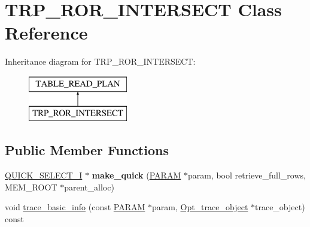 \hypertarget{classTRP__ROR__INTERSECT}{}\section{T\+R\+P\+\_\+\+R\+O\+R\+\_\+\+I\+N\+T\+E\+R\+S\+E\+CT Class Reference}
\label{classTRP__ROR__INTERSECT}
Inheritance diagram for T\+R\+P\+\_\+\+R\+O\+R\+\_\+\+I\+N\+T\+E\+R\+S\+E\+CT\+:\begin{figure}[H]
\begin{center}
\leavevmode
\includegraphics[height=2.000000cm]{classTRP__ROR__INTERSECT}
\end{center}
\end{figure}
\subsection*{Public Member Functions}
\begin{DoxyCompactItemize}
\item 
\mbox{\label{classTRP__ROR__INTERSECT_aec9e0cb402d87f02fa7acf7a63aa6db2}} 
\mbox{\hyperlink{classQUICK__SELECT__I}{Q\+U\+I\+C\+K\+\_\+\+S\+E\+L\+E\+C\+T\+\_\+I}} $\ast$ {\bfseries make\+\_\+quick} (\mbox{\hyperlink{classPARAM}{P\+A\+R\+AM}} $\ast$param, bool retrieve\+\_\+full\+\_\+rows, M\+E\+M\+\_\+\+R\+O\+OT $\ast$parent\+\_\+alloc)
\item 
void \mbox{\hyperlink{classTRP__ROR__INTERSECT_a298712f5cb20fc34554cfe1cc6570bec}{trace\+\_\+basic\+\_\+info}} (const \mbox{\hyperlink{classPARAM}{P\+A\+R\+AM}} $\ast$param, \mbox{\hyperlink{classOpt__trace__object}{Opt\+\_\+trace\+\_\+object}} $\ast$trace\+\_\+object) const
\end{DoxyCompactItemize}
